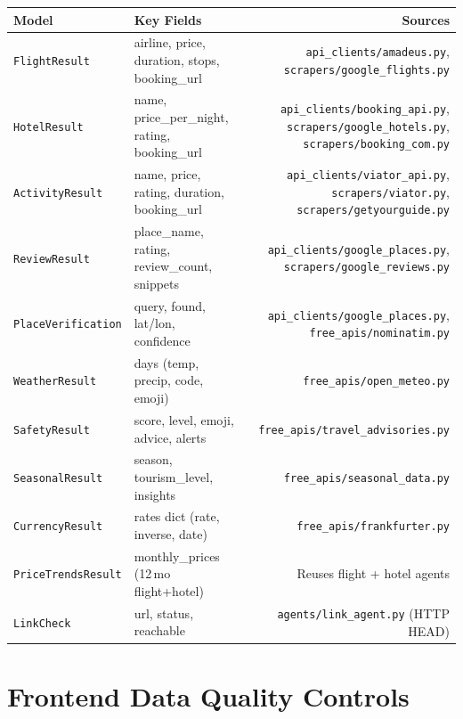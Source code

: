 \documentclass[11pt,a4paper]{article}
\begin{document}
{\small
\begin{tabularx}{\textwidth}{@{}L{3cm}L{3.8cm}R@{}}
\toprule
\textbf{Model} & \textbf{Key Fields} & \textbf{Sources} \\
\midrule
\texttt{FlightResult} & airline, price, duration, stops, booking\_url & \texttt{api\_clients/amadeus.py}, \texttt{scrapers/\allowbreak google\_flights.py} \\[4pt]
\texttt{HotelResult} & name, price\_per\_night, rating, booking\_url & \texttt{api\_clients/booking\_api.py}, \texttt{scrapers/\allowbreak google\_hotels.py}, \texttt{scrapers/booking\_com.py} \\[4pt]
\texttt{ActivityResult} & name, price, rating, duration, booking\_url & \texttt{api\_clients/viator\_api.py}, \texttt{scrapers/viator.py}, \texttt{scrapers/\allowbreak getyourguide.py} \\[4pt]
\texttt{ReviewResult} & place\_name, rating, review\_count, snippets & \texttt{api\_clients/google\_places.py}, \texttt{scrapers/\allowbreak google\_reviews.py} \\[4pt]
\texttt{PlaceVerification} & query, found, lat/lon, confidence & \texttt{api\_clients/google\_places.py}, \texttt{free\_apis/nominatim.py} \\[4pt]
\texttt{WeatherResult} & days (temp, precip, code, emoji) & \texttt{free\_apis/open\_meteo.py} \\[4pt]
\texttt{SafetyResult} & score, level, emoji, advice, alerts & \texttt{free\_apis/travel\_advisories.py} \\[4pt]
\texttt{SeasonalResult} & season, tourism\_level, insights & \texttt{free\_apis/seasonal\_data.py} \\[4pt]
\texttt{CurrencyResult} & rates dict (rate, inverse, date) & \texttt{free\_apis/frankfurter.py} \\[4pt]
\texttt{PriceTrendsResult} & monthly\_prices (12\,mo flight+hotel) & Reuses flight + hotel agents \\[4pt]
\texttt{LinkCheck} & url, status, reachable & \texttt{agents/link\_agent.py} (HTTP HEAD) \\
\bottomrule
\end{tabularx}}

\newpage
\section{Frontend Data Quality Controls}
\end{document}
